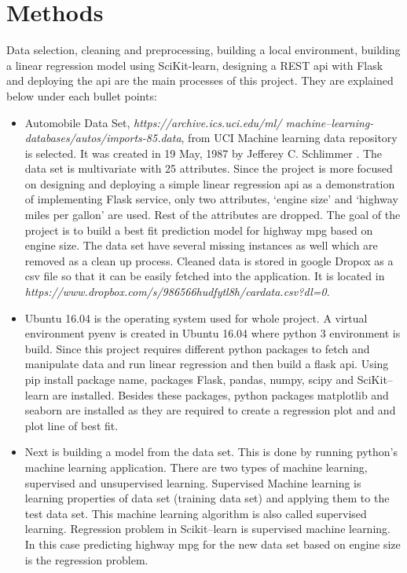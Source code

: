 \section{Methods}
  Data selection, cleaning and preprocessing, building a local
  environment, building a linear regression model using SciKit-learn,
  designing a REST api with Flask and deploying  the api are the main
  processes of this project. They are explained below under each bullet
  points:
\begin{itemize}
    \item Automobile Data Set, \textit{https://archive.ics.uci.edu/ml/
          machine--learning-databases/autos/imports-85.data}, from UCI
          Machine learning data repository is selected. It was created
          in 19 May, 1987 by Jefferey C. Schlimmer \cite{uci-com}. The
          data set is multivariate with 25 attributes. Since the project
          is more focused on designing and deploying a simple linear
          regression api as a demonstration of implementing Flask service,
          only two attributes, `engine size' and `highway miles per gallon'
          are used. Rest of the attributes are dropped. The goal of the
          project is to build a best fit prediction model for highway mpg
          based on engine size. The data set have several missing instances
 as well which are removed as a clean up process. Cleaned data is stored in
 google Dropox as a csv   file so that it can be easily fetched into the
 application. It is located in \textit{https://www.dropbox.com/s/986566hudfytl8h/cardata.csv?dl=0}.
    \item Ubuntu 16.04 is the operating system used for whole project.
  A virtual environment pyenv is created in Ubuntu 16.04 where python 3
 environment is build. Since this project requires different python
 packages to fetch and manipulate data and run linear regression and
 then build a flask api. Using pip install package name, packages Flask,
 pandas, numpy, scipy and SciKit--learn are installed. Besides these
 packages, python packages matplotlib and seaborn are installed as they
 are required to create a regression plot and and plot line of best fit. 
    \item Next is building a model from the data set. This is done by
 running python's machine learning application. There are two types of
 machine learning, supervised and unsupervised learning. Supervised
 Machine learning is learning properties of data set (training data set)
 and applying them to the test data set. This machine learning algorithm
 is also called supervised learning. Regression problem in Scikit--learn
 is supervised machine learning. In this case predicting highway mpg for
 the new data set based on engine size is the regression problem.
    

\end{itemize}
